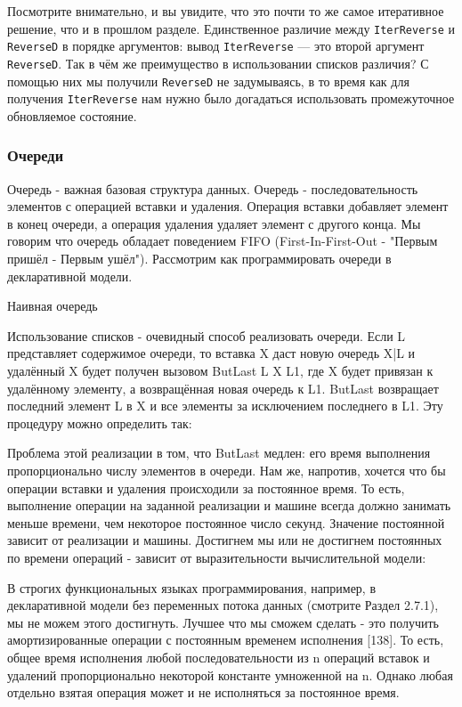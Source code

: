 Посмотрите внимательно, и вы увидите, что это почти то же самое итеративное решение, что и в прошлом разделе. Единственное различие между \lstinline!IterReverse! и \lstinline!ReverseD! в порядке аргументов: вывод \lstinline!IterReverse! --- это второй аргумент \lstinline!ReverseD!. Так в чём же преимущество в использовании списков различия? С помощью них мы получили \lstinline!ReverseD! не задумываясь, в то время как для получения \lstinline!IterReverse! нам нужно было догадаться использовать промежуточное обновляемое состояние.

\subsubsection{Очереди}

Очередь - важная базовая структура данных. Очередь - последовательность элементов с операцией вставки и удаления. Операция вставки добавляет элемент в конец очереди, а операция удаления удаляет элемент с другого конца. Мы говорим что очередь обладает поведением FIFO (First-In-First-Out - "Первым пришёл - Первым ушёл"). Рассмотрим как программировать очереди в декларативной модели.

Наивная очередь

Использование списков - очевидный способ реализовать очереди. Если L представляет содержимое очереди, то вставка X даст новую очередь X|L и удалённый X будет получен вызовом {ButLast L X L1}, где X будет привязан к удалённому элементу, а возвращённая новая очередь к L1. ButLast возвращает последний элемент L в X и все элементы за исключением последнего в L1. Эту процедуру можно определить так:

Проблема этой реализации в том, что ButLast медлен: его время выполнения пропорционально числу элементов в очереди. Нам же, напротив, хочется что бы операции вставки и удаления происходили за постоянное время. То есть, выполнение операции на заданной реализации и машине всегда должно занимать меньше времени, чем некоторое постоянное число секунд. Значение постоянной зависит от реализации и машины. Достигнем мы или не достигнем постоянных по времени операций - зависит от выразительности вычислительной модели:

В строгих функциональных языках программирования, например, в декларативной модели без переменных потока данных (смотрите Раздел 2.7.1), мы не можем этого достигнуть. Лучшее что мы сможем сделать - это получить амортизированные операции с постоянным временем исполнения [138]. То есть, общее время исполнения любой последовательности из n операций вставок и удалений пропорционально некоторой константе умноженной на n. Однако любая отдельно взятая операция может и не исполняться за постоянное время.

